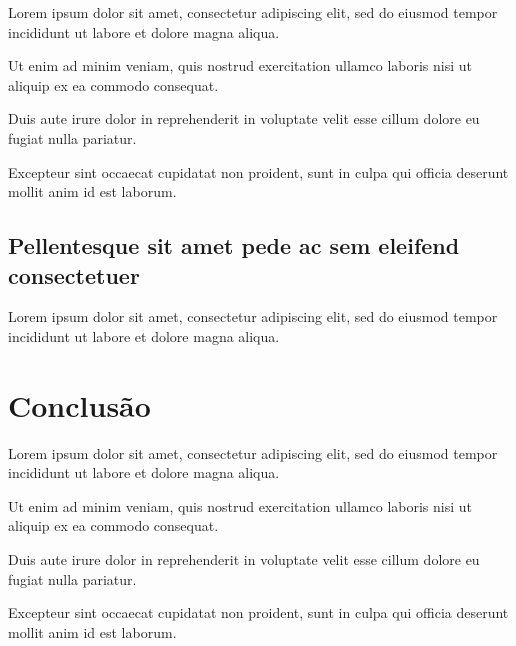 \documentclass[]{fateczl-abntex2}
\begin{document}
Lorem ipsum dolor sit amet, consectetur adipiscing elit, sed do eiusmod tempor incididunt ut labore et dolore magna aliqua.

Ut enim ad minim veniam, quis nostrud exercitation ullamco laboris nisi ut aliquip ex ea commodo consequat.

Duis aute irure dolor in reprehenderit in voluptate velit esse cillum dolore eu fugiat nulla pariatur. 

Excepteur sint occaecat cupidatat non proident, sunt in culpa qui officia deserunt mollit anim id est laborum.

\section{Pellentesque sit amet pede ac sem eleifend consectetuer}

Lorem ipsum dolor sit amet, consectetur adipiscing elit, sed do eiusmod tempor incididunt ut labore et dolore magna aliqua.

\chapter{Conclusão}

Lorem ipsum dolor sit amet, consectetur adipiscing elit, sed do eiusmod tempor incididunt ut labore et dolore magna aliqua.

Ut enim ad minim veniam, quis nostrud exercitation ullamco laboris nisi ut aliquip ex ea commodo consequat.

Duis aute irure dolor in reprehenderit in voluptate velit esse cillum dolore eu fugiat nulla pariatur. 

Excepteur sint occaecat cupidatat non proident, sunt in culpa qui officia deserunt mollit anim id est laborum.

\postextual


\end{document}
